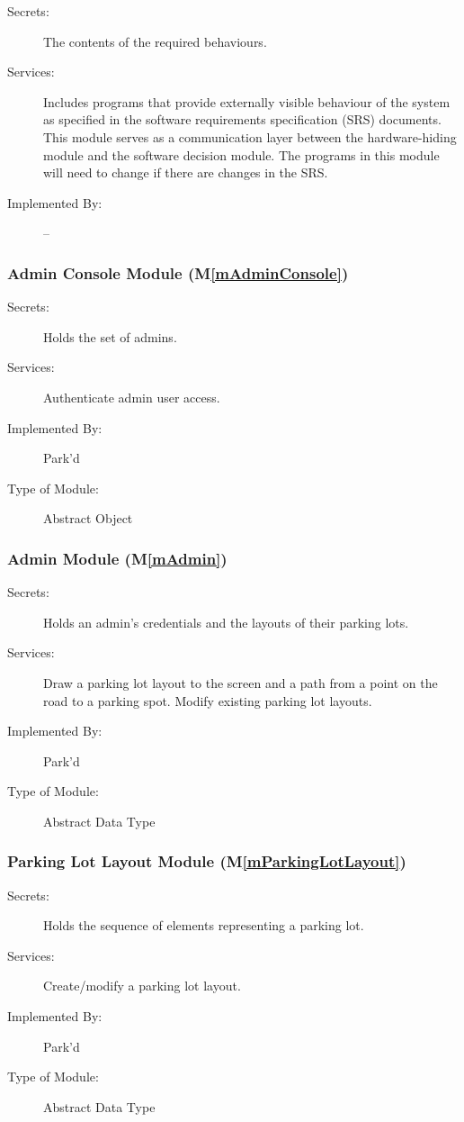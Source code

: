 \documentclass[12pt, titlepage]{article}
\newcommand{\mref}[1]{M\ref{#1}}
\begin{document}
\begin{description}
\item[Secrets:]The contents of the required behaviours.
\item[Services:]Includes programs that provide externally visible behaviour of
  the system as specified in the software requirements specification (SRS)
  documents. This module serves as a communication layer between the
  hardware-hiding module and the software decision module. The programs in this
  module will need to change if there are changes in the SRS.
\item[Implemented By:] --
\end{description}

\subsubsection{Admin Console Module (\mref{mAdminConsole})}
\begin{description}
\item[Secrets:] Holds the set of admins.
\item[Services:] Authenticate admin user access.
\item[Implemented By:] Park'd
\item[Type of Module:] Abstract Object
\end{description}

\subsubsection{Admin Module (\mref{mAdmin})}
\begin{description}
\item[Secrets:] Holds an admin's credentials and the layouts of their parking
lots.
\item[Services:] Draw a parking lot layout to the screen and a path from a point
on the road to a parking spot. Modify existing parking lot layouts.
\item[Implemented By:] Park'd
\item[Type of Module:] Abstract Data Type
\end{description}

\subsubsection{Parking Lot Layout Module (\mref{mParkingLotLayout})}
\begin{description}
\item[Secrets:] Holds the sequence of elements representing a parking lot.
\item[Services:] Create/modify a parking lot layout.
\item[Implemented By:] Park'd
\item[Type of Module:] Abstract Data Type
\end{description}
\end{document}
